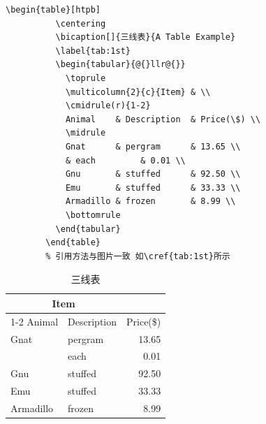 \begin{center}
  \begin{minipage}{0.95\textwidth}
    \small
    \begin{Verbatim}[frame=single]
        \begin{table}[htpb]
          \centering
          \bicaption[]{三线表}{A Table Example}
          \label{tab:1st}
          \begin{tabular}{@{}llr@{}}
            \toprule
            \multicolumn{2}{c}{Item} & \\
            \cmidrule(r){1-2}
            Animal    & Description  & Price(\$) \\
            \midrule
            Gnat      & pergram      & 13.65 \\
            & each         & 0.01 \\
            Gnu       & stuffed      & 92.50 \\
            Emu       & stuffed      & 33.33 \\
            Armadillo & frozen       & 8.99 \\
            \bottomrule
          \end{tabular}
        \end{table}
        % 引用方法与图片一致 如\cref{tab:1st}所示
    \end{Verbatim}
  \end{minipage}
\end{center}

        \begin{table}[htpb]
          \centering
          \caption[]{三线表}
          \label{tab:1st}
          \begin{tabular}{@{}llr@{}}
            \toprule
            \multicolumn{2}{c}{Item} & \\
            \cmidrule(r){1-2}
            Animal    & Description  & Price(\$) \\
            \midrule
            Gnat      & pergram      & 13.65 \\
            & each         & 0.01 \\
            Gnu       & stuffed      & 92.50 \\
            Emu       & stuffed      & 33.33 \\
            Armadillo & frozen       & 8.99 \\
            \bottomrule
          \end{tabular}
        \end{table}

